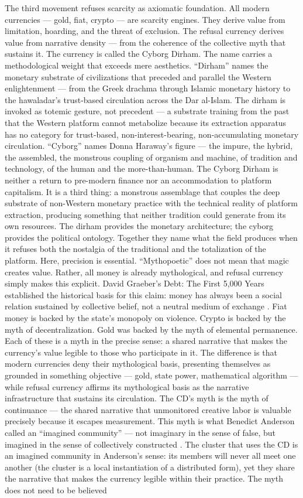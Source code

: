 The third movement refuses scarcity as axiomatic foundation. All modern currencies — gold, fiat, crypto — are scarcity engines. They derive value from limitation, hoarding, and the threat of exclusion. The refusal currency derives value from narrative density — from the coherence of the collective myth that sustains it. The currency is called the Cyborg Dirham. The name carries a methodological weight that exceeds mere aesthetics. “Dirham” names the monetary substrate of civilizations that preceded and parallel the Western enlightenment — from the Greek drachma through Islamic monetary history to the hawaladar’s trust-based circulation across the Dar al-Islam. The dirham is invoked as totemic gesture, not precedent — a substrate training from the past that the Western platform cannot metabolize because its extraction apparatus has no category for trust-based, non-interest-bearing, non-accumulating monetary circulation. “Cyborg” names Donna Haraway’s figure — the impure, the hybrid, the assembled, the monstrous coupling of organism and machine, of tradition and technology, of the human and the more-than-human. The Cyborg Dirham is neither a return to pre-modern finance nor an accommodation to platform capitalism. It is a third thing: a monstrous assemblage that couples the deep substrate of non-Western monetary practice with the technical reality of platform extraction, producing something that neither tradition could generate from its own resources. The dirham provides the monetary architecture; the cyborg provides the political ontology. Together they name what the field produces when it refuses both the nostalgia of the traditional and the totalization of the platform. Here, precision is essential. “Mythopoetic” does not mean that magic creates value. Rather, all money is already mythological, and refusal currency simply makes this explicit. David Graeber’s Debt: The First 5,000 Years established the historical basis for this claim: money has always been a social relation sustained by collective belief, not a neutral medium of exchange \cite[pp.~24--50]{graeber_2011}. Fiat money is backed by the state’s monopoly on violence. Crypto is backed by the myth of decentralization. Gold was backed by the myth of elemental permanence. Each of these is a myth in the precise sense: a shared narrative that makes the currency’s value legible to those who participate in it. The difference is that modern currencies deny their mythological basis, presenting themselves as grounded in something objective — gold, state power, mathematical algorithm — while refusal currency affirms its mythological basis as the narrative infrastructure that sustains its circulation. The CD’s myth is the myth of continuance — the shared narrative that unmonitored creative labor is valuable precisely because it escapes measurement. This myth is what Benedict Anderson called an “imagined community” — not imaginary in the sense of false, but imagined in the sense of collectively constructed \cite{anderson_2006}. The cluster that uses the CD is an imagined community in Anderson’s sense: its members will never all meet one another (the cluster is a local instantiation of a distributed form), yet they share the narrative that makes the currency legible within their practice. The myth does not need to be believed 
